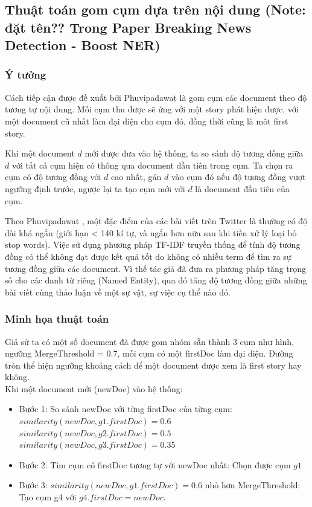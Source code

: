 	
\subsection{Thuật toán gom cụm dựa trên nội dung (Note: đặt tên?? Trong Paper Breaking News Detection - Boost NER)}
	\subsubsection{Ý tưởng}
	Cách tiếp cận được đề xuất bởi Phuvipadawat \cite{SwitPhuvipadawat} là gom cụm các document theo độ tương tự nội dung. Mỗi cụm thu được sẽ ứng với một story phát hiện được, với một document cũ nhất làm đại diện cho cụm đó, đồng thời cũng là môt first story.
	
	Khi một document $d$ mới được đưa vào hệ thống, ta so sánh độ tương đồng giữa $d$ với tất cả cụm hiện có thông qua document đầu tiên trong cụm. Ta chọn ra cụm có độ tương đồng với $d$ cao nhất, gán $d$ vào cụm đó nếu độ tương đồng vượt ngưỡng định trước, ngược lại ta tạo cụm mới với $d$ là document đầu tiên của cụm.
	
	Theo Phuvipadawat \cite{SwitPhuvipadawat}, một đặc điểm của các bài viết trên Twitter là thường có độ dài khá ngắn (giới hạn < 140 kí tự, và ngắn hơn nữa sau khi tiền xử lý loại bỏ stop words). Việc sử dụng phương pháp TF-IDF truyền thống để tính độ tương đồng có thể không đạt được kết quả tốt do không có nhiều term để tìm ra sự tương đồng giữa các document. Vì thế tác giả đã đưa ra phương pháp tăng trọng số cho các danh từ riêng (Named Entity), qua đó tăng độ tương đồng giữa những bài viết cùng thảo luận về một sự vật, sự việc cụ thể nào đó.
	
	\subsubsection{Minh họa thuật toán}
	Giả sử ta có một số document đã được gom nhóm sẵn thành 3 cụm như hình, ngưỡng MergeThreshold = 0.7, mỗi cụm có một firstDoc làm đại diện. Đường tròn thể hiện ngưỡng khoảng cách để một document được xem là first story hay không.\\
	
	Khi một document mới (newDoc) vào hệ thống: 
	\begin{itemize}
		\item Bước 1: So sánh newDoc với từng firstDoc của từng cụm:\\ 
		$similarity(newDoc, g1.firstDoc) = 0.6$\\
		$similarity(newDoc, g2.firstDoc) = 0.5$\\
		$similarity(newDoc, g3.firstDoc) = 0.35$%
		\item Bước 2: Tìm cụm có firstDoc tương tự với newDoc nhất: Chọn được cụm $g1$%
		\item Bước 3: $similarity(newDoc, g1.firstDoc) = 0.6$ nhỏ hơn MergeThreshold: Tạo cụm g4 với $g4.firstDoc = newDoc$.
	\end{itemize}
	
